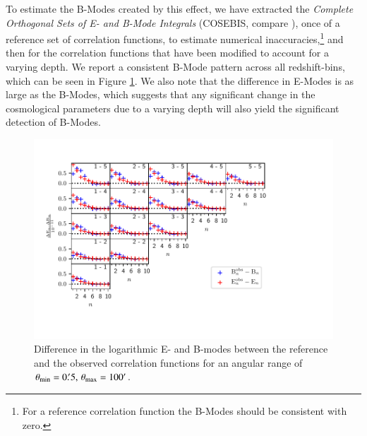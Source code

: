 \documentclass[referee]{aa} %
\renewcommand{\[}{\begin{equation}}
\renewcommand{\]}{\end{equation}}
\renewcommand{\rm}{\mathrm}
\begin{document}
To estimate the B-Modes created by this effect, we have extracted the \emph{Complete Orthogonal Sets of E- and B-Mode Integrals} (COSEBIS, compare \citet{2010A&A...520A.116S}), once of a reference set of correlation functions, to estimate numerical inaccuracies,\footnote{For a reference correlation function the B-Modes should be consistent with zero.} and then for the correlation functions that have been modified to account for a varying depth. We report a consistent B-Mode pattern across all redshift-bins, which can be seen in Figure \ref{fig:bmodes_cosebi}. We also note that the difference in E-Modes is as large as the B-Modes, which suggests that any significant change in the cosmological parameters due to a varying depth will also yield the significant detection of B-Modes.

\begin{figure}
\centering
\includegraphics[width = \textwidth, trim = {0 1.5cm 2.5cm 0}, clip]{images/eandbmodes0p5t100.pdf}
\caption{Difference in the logarithmic E- and B-modes between the reference and the observed correlation functions for an angular range of $\theta_{\rm{min}}=0.\!^\prime 5,\,\theta_{\rm{max}}=100\arcmin$.}
\label{fig:bmodes_cosebi}
\end{figure}

\end{document}
